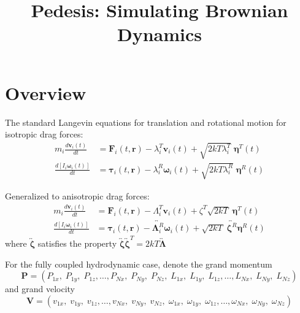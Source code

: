 \documentclass[11pt]{article}
\title{Pedesis: Simulating Brownian Dynamics}
\date{}
\author{}
\begin{document}
\maketitle

\section{Overview}
The standard Langevin equations for translation and rotational motion for isotropic drag forces:
\begin{subequations}
\begin{align}
    m_i \frac{d\bm{v}_i(t)}{dt} &= \bm{F}_i(t, \bm{r}) - \lambda_i^T \bm{v}_i(t) + \sqrt{2kT\lambda_i^T} \; \bm{\eta}^T(t) \\
    \frac{d[I_i \bm{\omega}_i(t)]}{dt} &= \bm{\tau}_i(t, \bm{r}) - \lambda_i^R \bm{\omega}_i(t) + \sqrt{2kT\lambda_i^R} \; \bm{\eta}^R(t)
\end{align}
\end{subequations}

Generalized to anisotropic drag forces:
\begin{subequations}
\begin{align}
    m_i \frac{d\bm{v}_i(t)}{dt} &= \bm{F}_i(t, \bm{r}) - \Lambda_i^T \bm{v}_i(t) + \zeta^T \sqrt{2kT} \; \bm{\eta}^T(t) \\
\frac{d[I_i \bm{\omega}_i(t)]}{dt} &= \bm{\tau}_i(t, \bm{r}) - \overleftrightarrow{\bm{\Lambda}_i^R} \bm{\omega}_i(t) + \sqrt{2kT}\; \overleftrightarrow{\bm{\zeta}^R}  \bm{\eta}^R(t)
\end{align}
\end{subequations}
where $\overleftrightarrow{\bm{\zeta}}$ satisfies the property $\overleftrightarrow{\bm{\zeta}} \overleftrightarrow{\bm{\zeta}}^T = 2kT\overleftrightarrow{\bm{\Lambda}}$

For the fully coupled hydrodynamic case, denote the grand momentum
\begin{equation}
    \bm{P} = (P_{1x},\; P_{1y},\; P_{1z}, \ldots, P_{Nx},\; P_{Ny},\; P_{Nz},\;
    L_{1x},\; L_{1y},\; L_{1z}, \ldots, L_{Nx},\; L_{Ny},\; L_{Nz})
\end{equation}
and grand velocity
\begin{equation}
    \bm{V} = (v_{1x},\; v_{1y},\; v_{1z}, \ldots, v_{Nx},\; v_{Ny},\; v_{Nz},\;
    \omega_{1x},\; \omega_{1y},\; \omega_{1z}, \ldots, \omega_{Nx},\; \omega_{Ny},\; \omega_{Nz})
\end{equation}
\end{document}
